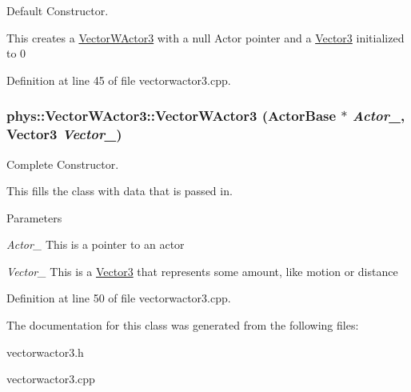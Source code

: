 Default Constructor. 

This creates a \hyperlink{classphys_1_1VectorWActor3}{VectorWActor3} with a null Actor pointer and a \hyperlink{classphys_1_1Vector3}{Vector3} initialized to 0 

Definition at line 45 of file vectorwactor3.cpp.

\hypertarget{classphys_1_1VectorWActor3_aab8024707cc3747d387d329536bb77f4}{
\subsubsection[{VectorWActor3}]{\setlength{\rightskip}{0pt plus 5cm}phys::VectorWActor3::VectorWActor3 ({\bf ActorBase} $\ast$ {\em Actor\_\-}, \/  {\bf Vector3} {\em Vector\_\-})}}
\label{de/ddc/classphys_1_1VectorWActor3_aab8024707cc3747d387d329536bb77f4}


Complete Constructor. 

This fills the class with data that is passed in. 
\begin{DoxyParams}{Parameters}
\item[{\em Actor\_\-}]This is a pointer to an actor \item[{\em Vector\_\-}]This is a \hyperlink{classphys_1_1Vector3}{Vector3} that represents some amount, like motion or distance \end{DoxyParams}


Definition at line 50 of file vectorwactor3.cpp.



The documentation for this class was generated from the following files:\begin{DoxyCompactItemize}
\item 
vectorwactor3.h\item 
vectorwactor3.cpp\end{DoxyCompactItemize}
